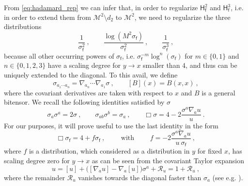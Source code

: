 \documentclass[12pt]{book}
\newcommand{\Mcal}{\mathcal{M}}
\newcommand{\Rcal}{\mathcal{R}}
\newcommand{\Hsf}{\mathsf{H}}
\newcommand{\fsf}{\mathsf{f}}
\theoremstyle{break}
\begin{document}
From \eqref{eq:hadamard_rep} we can infer that, in order to regularize $\Hsf^2_\fsf$ and $\Hsf^3_\fsf$, i.e. in order to extend them from $\Mcal^2 \setminus d_2$ to $\Mcal^2$, we need to regularize the three distributions
%
\begin{equation}
\frac{1}{\sigma_\fsf^2} \ , \qquad \frac{\log \left(M^2 \sigma_\fsf\right)}{\sigma_\fsf^2} \ , \qquad \frac{1}{\sigma_\fsf^3} \ ,
\label{eq:sigma_problematic}
\end{equation}
%
because all other occurring powers of $\sigma_\fsf$, i.e. $\sigma^{-m}_\fsf\log^n(\sigma_\fsf)$ for $m\in\{0,1\}$ and $n\in\{0,1,2,3\}$ have a scaling degree for $y\to x$ smaller than 4, and thus can be uniquely extended to the diagonal. To this avail, we define 
%
\begin{equation*}
\sigma_{a_1\cdots a_n} = \nabla_{a_n} \cdots \nabla_{a_1} \sigma \ , \qquad [B](x) = B(x,x) \ , 
\end{equation*}
%
where the covariant derivatives are taken with respect to $x$ and $B$ is a general bitensor. We recall the following identities satisfied by $\sigma$
%
\begin{equation}
\sigma_a \sigma^a = 2 \sigma \ , \qquad 
\sigma_{ab} \sigma^b = \sigma_a \ , \qquad 
\Box \sigma = 4 - 2 \frac{\sigma^a \nabla_a u}{u} \ .
\label{eq:sigma_identities}
\end{equation}
%
For our purposes, it will prove useful to use the last identity in the form
%
\begin{equation*}
\Box \sigma_\fsf = 4 + f \sigma_\fsf \ , \qquad
\mbox{ with } \qquad f = - 2 \frac{\sigma^a \nabla_a u}{u \ \sigma_\fsf} \ ,
\label{eq:def_f_sigma}
\end{equation*}
%
where $f$ is a distribution, which considered as a distribution in $y$ for fixed $x$, has scaling degree zero for $y \to x$ as can be seen from the covariant Taylor expansion
%
\begin{equation*}
u = [u] + \bigg( [\nabla_a u] - \nabla_a [u] \bigg) \sigma^a + \Rcal_u = 1 + \Rcal_u \ , 
\end{equation*}
%
where the remainder $\Rcal_u$ vanishes towards the diagonal faster than $\sigma_a$  (see e.g. \cite{poisson_motion_2011}).


\bigskip
\end{document}
